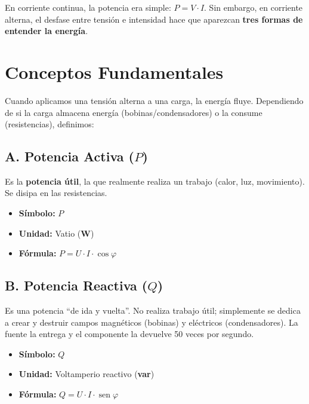 \documentclass[
  a4paper,
  DIV=11,
  numbers=noendperiod]{scrreprt}
\providecommand{\tightlist}{%
  \setlength{\itemsep}{0pt}\setlength{\parskip}{0pt}}
\newcommand{\sen}{\operatorname{sen}}
\begin{document}
En corriente continua, la potencia era simple: \(P = V \cdot I\). Sin
embargo, en corriente alterna, el desfase entre tensión e intensidad
hace que aparezcan \textbf{tres formas de entender la energía}.

\section{Conceptos Fundamentales}\label{conceptos-fundamentales-1}

Cuando aplicamos una tensión alterna a una carga, la energía fluye.
Dependiendo de si la carga almacena energía (bobinas/condensadores) o la
consume (resistencias), definimos:

\subsection*{\texorpdfstring{A. Potencia Activa
(\(P\))}{A. Potencia Activa (P)}}\label{a.-potencia-activa-p}

Es la \textbf{potencia útil}, la que realmente realiza un trabajo
(calor, luz, movimiento). Se disipa en las resistencias.

\vspace{-1em}

\begin{itemize}
\tightlist
\item
  \textbf{Símbolo:} \(P\)
\item
  \textbf{Unidad:} Vatio (\textbf{W})
\item
  \textbf{Fórmula:} \(P = U \cdot I \cdot \cos \varphi\)
\end{itemize}

\subsection*{\texorpdfstring{B. Potencia Reactiva
(\(Q\))}{B. Potencia Reactiva (Q)}}\label{b.-potencia-reactiva-q}

Es una potencia ``de ida y vuelta''. No realiza trabajo útil;
simplemente se dedica a crear y destruir campos magnéticos (bobinas) y
eléctricos (condensadores). La fuente la entrega y el componente la
devuelve 50 veces por segundo.

\vspace{-1em}

\begin{itemize}
\tightlist
\item
  \textbf{Símbolo:} \(Q\)
\item
  \textbf{Unidad:} Voltamperio reactivo (\textbf{var})
\item
  \textbf{Fórmula:} \(Q = U \cdot I \cdot \sen \varphi\)
\end{itemize}
\end{document}
